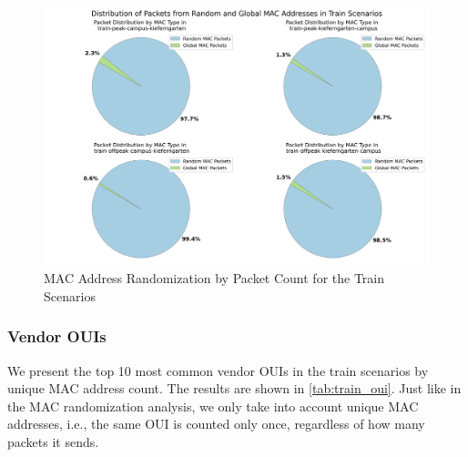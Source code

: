 \documentclass[sigconf,nonacm]{acmart}
\begin{document}
\begin{figure}
    \centering
    \includegraphics[width=\columnwidth]{images/part1/mac-address-types/train-scenarios-packet-based.png}
    \caption{MAC Address Randomization by Packet Count for the Train Scenarios}
    \label{fig:train_mac_randomization_packet_count}
\end{figure}

\subsubsection{Vendor OUIs}
\label{sec:part-1/train/oui}
We present the top 10 most common vendor OUIs in the train scenarios by unique MAC address count. The results are shown in \cref{tab:train_oui}. Just like in the MAC randomization analysis, we only take into account unique MAC addresses, i.e., the same OUI is counted only once, regardless of how many packets it sends.
\end{document}
